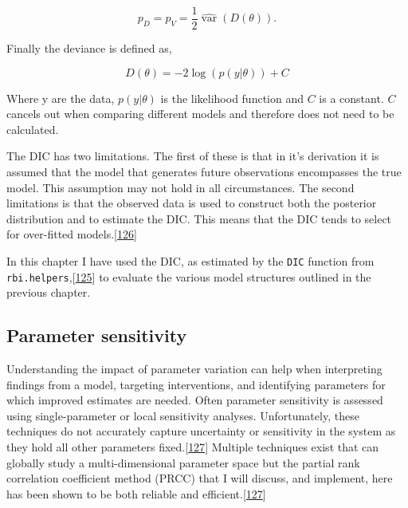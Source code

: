 \documentclass[11pt,twoside]{bristolthesis}
\begin{document}
  \[p_{D}=p_{V}={\frac  {1}{2}}\widehat {\operatorname {var}}\left(D(\theta )\right).\]
  
  Finally the deviance is defined as,
  
  \[D(\theta)=-2\log(p(y|\theta ))+C\]
  
  Where y are the data, \(\displaystyle p(y|\theta)\) is the likelihood function and \(C\) is a constant. \(C\) cancels out when comparing different models and therefore does not need to be calculated.
  
  The DIC has two limitations. The first of these is that in it's derivation it is assumed that the model that generates future observations encompasses the true model. This assumption may not hold in all circumstances. The second limitations is that the observed data is used to construct both the posterior distribution and to estimate the DIC. This means that the DIC tends to select for over-fitted models.{[}\protect\hyperlink{ref-Gelman:nll_LBlw}{126}{]}
  
  In this chapter I have used the DIC, as estimated by the \texttt{DIC} function from \texttt{rbi.helpers},{[}\protect\hyperlink{ref-Funk:2019uw}{125}{]} to evaluate the various model structures outlined in the previous chapter.
  
  \hypertarget{parameter-sensitivity}{%
  \subsection{Parameter sensitivity}\label{parameter-sensitivity}}
  
  Understanding the impact of parameter variation can help when interpreting findings from a model, targeting interventions, and identifying parameters for which improved estimates are needed. Often parameter sensitivity is assessed using single-parameter or local sensitivity analyses. Unfortunately, these techniques do not accurately capture uncertainty or sensitivity in the system as they hold all other parameters fixed.{[}\protect\hyperlink{ref-Marino2009a}{127}{]} Multiple techniques exist that can globally study a multi-dimensional parameter space but the partial rank correlation coefficient method (PRCC) that I will discuss, and implement, here has been shown to be both reliable and efficient.{[}\protect\hyperlink{ref-Marino2009a}{127}{]}
  
\end{document}
